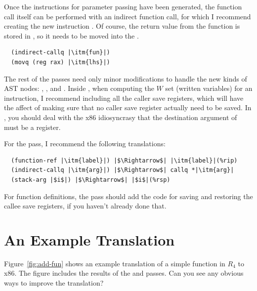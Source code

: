 \documentclass[11pt]{book}
\begin{document}
Once the instructions for parameter passing have been generated, the
function call itself can be performed with an indirect function call,
for which I recommend creating the new instruction
. Of course, the return value from the function
is stored in , so it needs to be moved into the .
\begin{lstlisting}
  (indirect-callq |\itm{fun}|)
  (movq (reg rax) |\itm{lhs}|)
\end{lstlisting}

The rest of the passes need only minor modifications to handle the new
kinds of AST nodes: , , and
. Inside , when computing the $W$ set
(written variables) for an  instruction, I
recommend including all the caller save registers, which will have the
affect of making sure that no caller save register actually need to be
saved. In , you should deal with the x86
idiosyncrasy that the destination argument of  must be a
register.

For the  pass, I recommend the following translations:
\begin{lstlisting}
  (function-ref |\itm{label}|) |$\Rightarrow$| |\itm{label}|(%rip)
  (indirect-callq |\itm{arg}|) |$\Rightarrow$| callq *|\itm{arg}|
  (stack-arg |$i$|) |$\Rightarrow$| |$i$|(%rsp)
\end{lstlisting}
For function definitions, the  pass should add the
code for saving and restoring the callee save registers, if you
haven't already done that.

\section{An Example Translation}

Figure~\ref{fig:add-fun} shows an example translation of a simple
function in $R_4$ to x86. The figure includes the results of the
 and  passes.  Can you see any
obvious ways to improve the translation?
\end{document}
